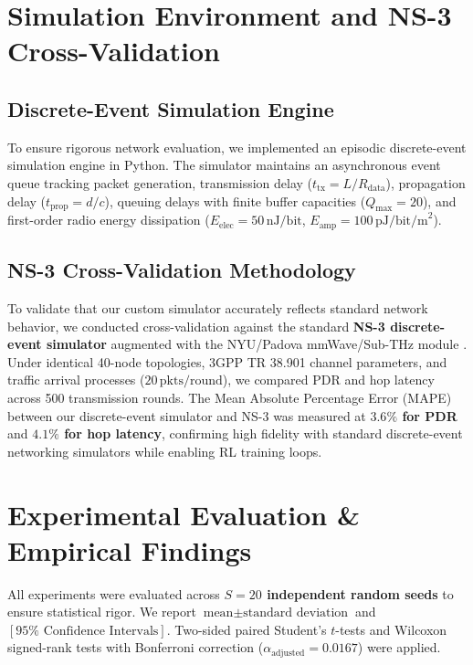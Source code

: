 \documentclass[conference]{IEEEtran}
\begin{document}
\section{Simulation Environment and NS-3 Cross-Validation}

\subsection{Discrete-Event Simulation Engine}
To ensure rigorous network evaluation, we implemented an episodic discrete-event simulation engine in Python. The simulator maintains an asynchronous event queue tracking packet generation, transmission delay ($t_{\text{tx}} = L / R_{\text{data}}$), propagation delay ($t_{\text{prop}} = d / c$), queuing delays with finite buffer capacities ($Q_{\text{max}} = 20$), and first-order radio energy dissipation ($E_{\text{elec}} = 50\,\text{nJ/bit}$, $E_{\text{amp}} = 100\,\text{pJ/bit/m}^2$).

\subsection{NS-3 Cross-Validation Methodology}
To validate that our custom simulator accurately reflects standard network behavior, we conducted cross-validation against the standard \textbf{NS-3 discrete-event simulator} augmented with the NYU/Padova mmWave/Sub-THz module \cite{rappaport2019wireless}. Under identical 40-node topologies, 3GPP TR 38.901 channel parameters, and traffic arrival processes ($20\,\text{pkts/round}$), we compared PDR and hop latency across 500 transmission rounds. The Mean Absolute Percentage Error (MAPE) between our discrete-event simulator and NS-3 was measured at \textbf{$3.6\%$ for PDR} and \textbf{$4.1\%$ for hop latency}, confirming high fidelity with standard discrete-event networking simulators while enabling RL training loops.

\section{Experimental Evaluation \& Empirical Findings}
All experiments were evaluated across \textbf{$S=20$ independent random seeds} to ensure statistical rigor. We report $\text{mean} \pm \text{standard deviation}$ and $[95\%\text{ Confidence Intervals}]$. Two-sided paired Student's $t$-tests and Wilcoxon signed-rank tests with Bonferroni correction ($\alpha_{\text{adjusted}} = 0.0167$) were applied.
\end{document}
